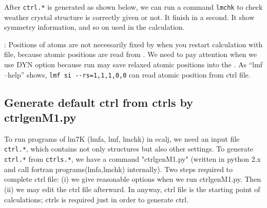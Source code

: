 After \verb+ctrl.*+ is generated as shown below, 
we can run a command \verb+lmchk+ to check weather crystal
structure is correctly given or not. It finish in a second.
It show symmetry information, and so on used in the calculation.

: 
Positions of atoms are not necessarily fixed by  when
you restart calculation with  file, because 
atomic positions are read from .
We need to pay attention when we use DYN option because
 run may save relaxed atomic positions into the .
As ``lmf --help'' shows, \verb#lmf si --rs=1,1,1,0,0# can read atomic
position from ctrl file.


\subsection{Generate default ctrl from ctrls by ctrlgenM1.py}
To run programs of lm7K (lmfa, lmf, lmchk) in ecalj,
we need an input file \verb+ctrl.*+, which contains not only structures
but also other settings.
To generate \verb+ctrl.*+ from \verb+ctrls.*+, we have a command "ctrlgenM1.py" (written
in python 2.x and call fortran programs(lmfa,lmchk) internally).
Two steps required to complete ctrl file:
(i) we give reasonable options when we run ctrlgenM1.py. 
Then (ii) we may edit the ctrl file afterward.
In anyway, ctrl file is the starting point of calculations;
ctrls is required just in order to generate ctrl.

